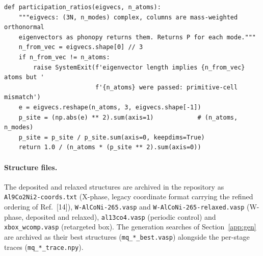 \begin{lstlisting}
def participation_ratios(eigvecs, n_atoms):
    """eigvecs: (3N, n_modes) complex, columns are mass-weighted orthonormal
    eigenvectors as phonopy returns them. Returns P for each mode."""
    n_from_vec = eigvecs.shape[0] // 3
    if n_from_vec != n_atoms:
        raise SystemExit(f'eigenvector length implies {n_from_vec} atoms but '
                         f'{n_atoms} were passed: primitive-cell mismatch')
    e = eigvecs.reshape(n_atoms, 3, eigvecs.shape[-1])
    p_site = (np.abs(e) ** 2).sum(axis=1)            # (n_atoms, n_modes)
    p_site = p_site / p_site.sum(axis=0, keepdims=True)
    return 1.0 / (n_atoms * (p_site ** 2).sum(axis=0))
\end{lstlisting}

\paragraph{Structure files.}
The deposited and relaxed structures are archived in the repository as
\texttt{Al9Co2Ni2-coords.txt} (X-phase, legacy coordinate format carrying the
refined ordering of Ref.~[14]), \texttt{W-AlCoNi-265.vasp} and
\texttt{W-AlCoNi-265-relaxed.vasp} (W-phase, deposited and relaxed),
\texttt{al13co4.vasp} (periodic control) and \texttt{xbox\_wcomp.vasp}
(retargeted box). The generation searches of Section~\ref{app:gen} are archived as their best structures (\texttt{mq\_*\_best.vasp}) alongside the per-stage traces (\texttt{mq\_*\_trace.npy}).
\clearpage

